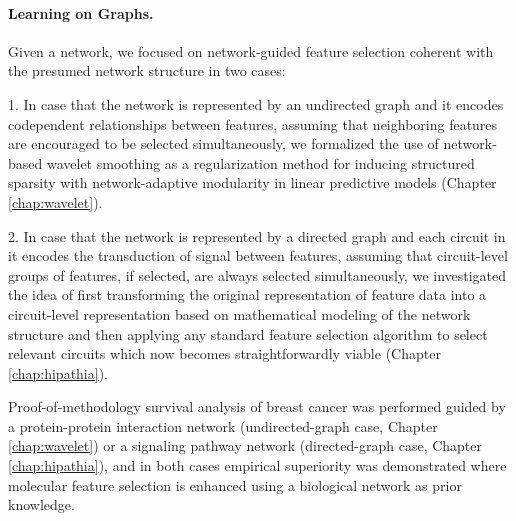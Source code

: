 \paragraph{Learning on Graphs.}

Given a network, we focused on network-guided feature selection coherent with the presumed network structure in two cases:
\begin{bulletList}
\item[1.] In case that the network is represented by an undirected graph and it encodes codependent relationships between features, assuming that neighboring features are encouraged to be selected simultaneously, we formalized the use of network-based wavelet smoothing as a regularization method for inducing structured sparsity with network-adaptive modularity in linear predictive models (Chapter \ref{chap:wavelet}).
\item[2.] In case that the network is represented by a directed graph and each circuit in it encodes the transduction of signal between features, assuming that circuit-level groups of features, if selected, are always selected simultaneously, we investigated the idea of first transforming the original representation of feature data into a circuit-level representation based on mathematical modeling of the network structure and then applying any standard feature selection algorithm to select relevant circuits which now becomes straightforwardly viable (Chapter \ref{chap:hipathia}).
\end{bulletList}
Proof-of-methodology survival analysis of breast cancer was performed guided by a protein-protein interaction network (undirected-graph case, Chapter \ref{chap:wavelet}) or a signaling pathway network (directed-graph case, Chapter \ref{chap:hipathia}), and in both cases empirical superiority was demonstrated where molecular feature selection is enhanced using a biological network as prior knowledge.\\


